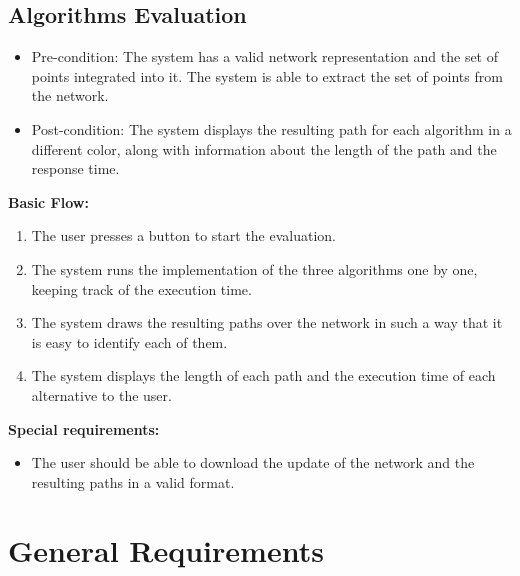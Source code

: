 \documentclass[11pt]{article}
\begin{document}
\subsection{Algorithms Evaluation}

\begin{itemize}
    \item Pre-condition: The system has a valid network representation and the set of points integrated into it. The system is able to extract the set of points from the network.
    \item Post-condition: The system displays the resulting path for each algorithm in a different color, along with information about the length of the path and the response time.
\end{itemize}

\textbf{Basic Flow:}
\begin{enumerate}
    \item The user presses a button to start the evaluation.
    \item The system runs the implementation of the three algorithms one by one, keeping track of the execution time.
    \item The system draws the resulting paths over the network in such a way that it is easy to identify each of them.
    \item The system displays the length of each path and the execution time of each alternative to the user.
\end{enumerate}

\textbf{Special requirements:}
\begin{itemize}
    \item The user should be able to download the update of the network and the resulting paths in a valid format.
\end{itemize}

\section{General Requirements}
\end{document}
